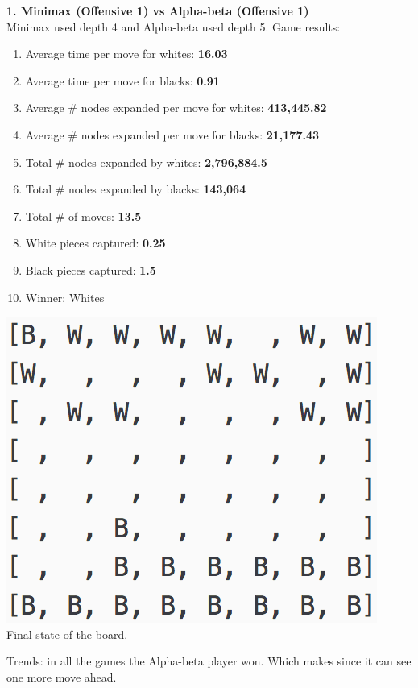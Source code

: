 \documentclass[11pt]{article}
\begin{document}
\textbf{1. Minimax (Offensive 1) vs Alpha-beta (Offensive 1)}\\
Minimax used depth 4 and Alpha-beta used depth 5.
Game results:
\begin{enumerate}
\item Average time per move for whites: \textbf{16.03}
\item Average time per move for blacks: \textbf{0.91}
\item Average \# nodes expanded per move for whites: \textbf{413,445.82}
\item Average \# nodes expanded per move for blacks:  \textbf{21,177.43}
\item Total \# nodes expanded by whites: \textbf{2,796,884.5}
\item Total \# nodes expanded by blacks: \textbf{143,064}
\item Total \# of moves: \textbf{13.5}
\item White pieces captured: \textbf{0.25}
\item Black pieces captured: \textbf{1.5}
\item Winner: Whites
\end{enumerate}
\begin{center}
\includegraphics[scale=1]{part2/minimax-o1-vs-ab-o1.png}\\
Final state of the board.
\end{center}
Trends: in all the games the Alpha-beta player won. Which makes since it can see one more move ahead. \\
\end{document}
